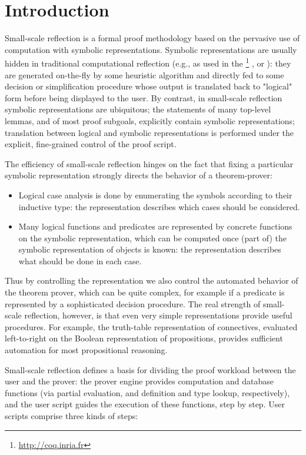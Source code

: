\section{Introduction}\label{sec:intro}
Small-scale reflection is a formal proof methodology based on the
pervasive use of computation with symbolic representations. Symbolic
representations are usually hidden in traditional computational
reflection (e.g., as used in the
\Coq{}\footnote{\url{http://coq.inria.fr}} , or ):
they are generated on-the-fly by some heuristic algorithm and directly
fed to some decision or simplification procedure whose output is
translated back to "logical" form before being displayed to the
user. By contrast, in small-scale reflection symbolic representations
are ubiquitous; the statements of many top-level lemmas, and of most
proof subgoals, explicitly contain symbolic representations;
translation between logical and symbolic representations is performed
under the explicit, fine-grained control of the proof script.

The efficiency of small-scale reflection hinges on the fact that
fixing a particular symbolic representation strongly directs the
behavior of a theorem-prover:

\begin{itemize}
\item Logical case analysis is done by
enumerating the symbols according to their inductive type: the
representation describes which cases should be considered.
\item Many
logical functions and predicates are represented by concrete
functions on the symbolic representation, which can be computed once
(part of) the symbolic representation of objects is known: the
representation describes what should be done in each case.
\end{itemize}

Thus by controlling the representation we also control the automated
behavior of the theorem prover, which can be quite complex,
for example if a predicate is represented by a sophisticated decision
procedure. The real strength of small-scale reflection, however, is
that even very simple representations provide useful procedures. For
example, the truth-table representation of connectives, evaluated
left-to-right
on the Boolean representation of propositions, provides sufficient
automation for most propositional reasoning.

Small-scale reflection defines a basis for dividing the proof workload
between the user and the prover: the prover engine provides computation
and database functions (via partial evaluation, and definition and
type lookup, respectively), and the user script guides the execution
of these functions, step by step. User scripts comprise three kinds of
steps:

